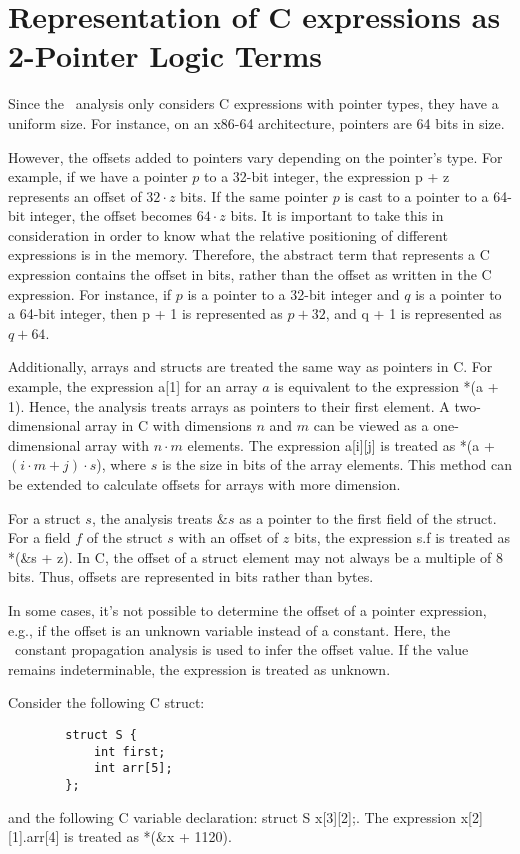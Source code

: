\section{Representation of C expressions as 2-Pointer Logic Terms}

Since the \cpo\ analysis only considers C expressions with pointer types, they have a uniform size.
For instance, on an x86-64 architecture, pointers are 64 bits in size.

However, the offsets added to pointers vary depending on the pointer's type.
For example, if we have a pointer $p$ to a 32-bit integer,
the expression \textsf{p + z} represents an offset of $32 \cdot z$ bits.
If the same pointer $p$ is cast to a pointer to a 64-bit integer, the offset becomes $64 \cdot z$ bits.
It is important to take this in consideration in order to know what the relative positioning of
different expressions is in the memory.
Therefore, the abstract term that represents a C expression contains the offset in bits, rather than the offset as written in the C expression.
For instance, if $p$ is a pointer to a 32-bit integer and $q$ is a pointer to a 64-bit integer, then \textsf{p + 1} is represented as $p + 32$, and \textsf{q + 1} is represented as $q + 64$.

Additionally, arrays and structs are treated the same way as pointers in C.
For example, the expression \textsf{a[1]} for an array $a$ is equivalent to the expression \textsf{*(a + 1)}.
Hence, the analysis treats arrays as pointers to their first element.
A two-dimensional array in C with dimensions $n$ and $m$ can be viewed as a one-dimensional array with $n \cdot m$ elements.
The expression \textsf{a[i][j]} is treated as \textsf{*(a + $(i \cdot m + j) \cdot s$)}, where $s$ is the size in bits of the array elements.
This method can be extended to calculate offsets for arrays with more dimension.

For a struct $s$, the analysis treats $\&s$ as a pointer to the first field of the struct.
For a field $f$ of the struct $s$ with an offset of $z$ bits,
the expression \textsf{s.f} is treated as \textsf{*(\&s + z)}.
In C, the offset of a struct element may not always be a multiple of 8 bits.
Thus, offsets are represented in bits rather than bytes.

In some cases, it's not possible to determine the offset of a pointer expression,
e.g., if the offset is an unknown variable instead of a constant.
Here, the \goblint\ constant propagation analysis is used to infer the offset value.
If the value remains indeterminable, the expression is treated as unknown.

\begin{example}
    Consider the following C struct:
    \begin{lstlisting}
        struct S {
            int first;
            int arr[5];
        };
    \end{lstlisting}
    and the following C variable declaration: \textsf{struct S x[3][2];}.
    The expression \textsf{x[2][1].arr[4]} is treated as \textsf{*(\&x + 1120)}.
\end{example}
